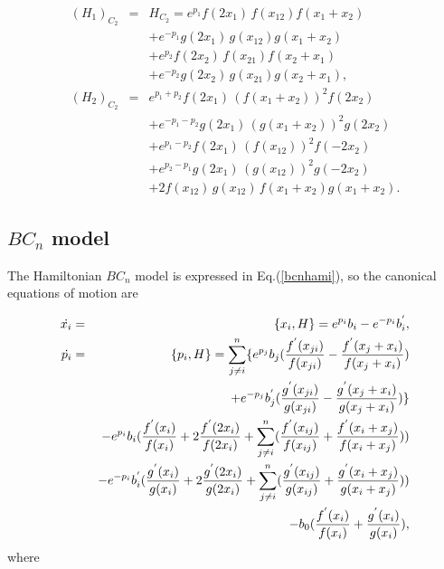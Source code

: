 \documentclass[a4paper,12pt]{article}
\begin{document}
\begin{eqnarray}
(H_{1})_{C_{2}} &=&H_{C_{2}}=e^{p_{1}}f(2x_{1})\,f(x_{12})f(x_{1}+x_{2})
\nonumber \\
&&+e^{-p_{1}}g(2x_{1})\,g(x_{12})g(x_{1}+x_{2})	 \nonumber \\
&&+e^{p_{2}}f(2x_{2})\,f(x_{21})f(x_{2}+x_{1})	\nonumber \\
&&+e^{-p_{2}}g(2x_{2})\,g(x_{21})g(x_{2}+x_{1}), \\
(H_{2})_{C_{2}} &=&e^{p_{1}+p_{2}}f(2x_{1})\,(f(x_{1}+x_{2}))^{2}f(2x_{2})
\nonumber \\
&&+e^{-p_{1}-p_{2}}g(2x_{1})\,(g(x_{1}+x_{2}))^{2}g(2x_{2})  \nonumber \\
&&+e^{p_{1}-p_{2}}f(2x_{1})\,(f(x_{12}))^{2}f(-2x_{2})	\nonumber \\
&&+e^{p_{2}-p_{1}}g(2x_{1})\,(g(x_{12}))^{2}g(-2x_{2})	\nonumber \\
&&+2f(x_{12})\,g(x_{12})\,f(x_{1}+x_{2})g(x_{1}+x_{2}).
\end{eqnarray}

\subsection{$BC_{n}$ model}

The Hamiltonian $BC_{n}$ model is expressed in Eq.(\ref{bcnhami}), so the
canonical equations of motion are

\begin{eqnarray}
\dot{x_{i}} &=&\{x_{i},H\}=e^{p_{i}}b_{i}-e^{-p_{i}}b_{i}^{^{\prime }},
\label{mobcn1} \\
\dot{p_{i}} &=&\{p_{i},H\}=\sum_{j\neq i}^{n}\{e^{p_{j}}b_{j}(\frac{%
f^{^{\prime }}(x_{ji})}{f(x_{ji})}-\frac{f^{^{\prime }}(x_{j}+x_{i})}{%
f(x_{j}+x_{i})})  \nonumber \\
&&+e^{-p_{j}}b_{j}^{^{\prime }}(\frac{g^{^{\prime }}(x_{ji})}{g(x_{ji})}-%
\frac{g^{^{\prime }}(x_{j}+x_{i})}{g(x_{j}+x_{i})})\}  \nonumber \\
&&-e^{p_{i}}b_{i}(\frac{f^{^{\prime }}(x_{i})}{f(x_{i})}+2\frac{f^{^{\prime
}}(2x_{i})}{f(2x_{i})}+\sum_{j\neq i}^{n}(\frac{f^{^{\prime }}(x_{ij})}{%
f(x_{ij})}+\frac{f^{^{\prime }}(x_{i}+x_{j})}{f(x_{i}+x_{j})}))	 \nonumber \\
&&-e^{-p_{i}}b_{i}^{^{\prime }}(\frac{g^{^{\prime }}(x_{i})}{g(x_{i})}+2%
\frac{g^{^{\prime }}(2x_{i})}{g(2x_{i})}+\sum_{j\neq i}^{n}(\frac{%
g^{^{\prime }}(x_{ij})}{g(x_{ij})}+\frac{g^{^{\prime }}(x_{i}+x_{j})}{%
g(x_{i}+x_{j})}))  \nonumber \\
&&-b_{0}(\frac{f^{^{\prime }}(x_{i})}{f(x_{i})}+\frac{g^{^{\prime }}(x_{i})}{%
g(x_{i})}),  \label{mobcn2}
\end{eqnarray}
where
\end{document}

